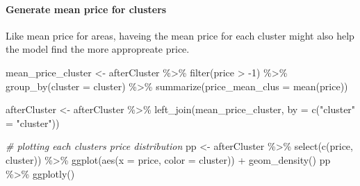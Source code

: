 \documentclass[
]{article}
\newenvironment{Shaded}{\begin{snugshade}}{\end{snugshade}}
\newcommand{\AttributeTok}[1]{\textcolor[rgb]{0.77,0.63,0.00}{#1}}
\newcommand{\CommentTok}[1]{\textcolor[rgb]{0.56,0.35,0.01}{\textit{#1}}}
\newcommand{\DecValTok}[1]{\textcolor[rgb]{0.00,0.00,0.81}{#1}}
\newcommand{\FunctionTok}[1]{\textcolor[rgb]{0.00,0.00,0.00}{#1}}
\newcommand{\NormalTok}[1]{#1}
\newcommand{\OtherTok}[1]{\textcolor[rgb]{0.56,0.35,0.01}{#1}}
\newcommand{\SpecialCharTok}[1]{\textcolor[rgb]{0.00,0.00,0.00}{#1}}
\newcommand{\StringTok}[1]{\textcolor[rgb]{0.31,0.60,0.02}{#1}}
\begin{document}
\begin{Shaded}
\end{Shaded}

\hypertarget{generate-mean-price-for-clusters}{%
\paragraph{Generate mean price for
clusters}\label{generate-mean-price-for-clusters}}

Like mean price for areas, haveing the mean price for each cluster might
also help the model find the more appropreate price.

\begin{Shaded}
\begin{Highlighting}[]
\NormalTok{mean\_price\_cluster }\OtherTok{\textless{}{-}}\NormalTok{ afterCluster }\SpecialCharTok{\%\textgreater{}\%} 
  \FunctionTok{filter}\NormalTok{(price }\SpecialCharTok{\textgreater{}} \SpecialCharTok{{-}}\DecValTok{1}\NormalTok{) }\SpecialCharTok{\%\textgreater{}\%} 
  \FunctionTok{group\_by}\NormalTok{(}\AttributeTok{cluster =}\NormalTok{ cluster) }\SpecialCharTok{\%\textgreater{}\%}
  \FunctionTok{summarize}\NormalTok{(}\AttributeTok{price\_mean\_clus =} \FunctionTok{mean}\NormalTok{(price))}

\NormalTok{afterCluster }\OtherTok{\textless{}{-}}\NormalTok{ afterCluster }\SpecialCharTok{\%\textgreater{}\%} \FunctionTok{left\_join}\NormalTok{(mean\_price\_cluster, }\AttributeTok{by =} \FunctionTok{c}\NormalTok{(}\StringTok{"cluster"} \OtherTok{=} \StringTok{"cluster"}\NormalTok{))}

\CommentTok{\# plotting each cluster\textquotesingle{}s price distribution }
\NormalTok{pp }\OtherTok{\textless{}{-}}\NormalTok{ afterCluster }\SpecialCharTok{\%\textgreater{}\%} \FunctionTok{select}\NormalTok{(}\FunctionTok{c}\NormalTok{(price, cluster)) }\SpecialCharTok{\%\textgreater{}\%} \FunctionTok{ggplot}\NormalTok{(}\FunctionTok{aes}\NormalTok{(}\AttributeTok{x =}\NormalTok{ price, }\AttributeTok{color =}\NormalTok{ cluster)) }\SpecialCharTok{+} \FunctionTok{geom\_density}\NormalTok{()}
\NormalTok{pp }\SpecialCharTok{\%\textgreater{}\%} \FunctionTok{ggplotly}\NormalTok{()}
\end{Highlighting}
\end{Shaded}
\end{document}

